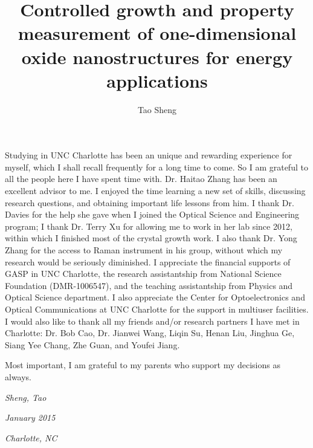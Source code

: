   \title{Controlled growth and property measurement of one-dimensional oxide nanostructures for energy applications}
  \author{Tao Sheng}
  \thesisyear{\the\year}



\maketitle



\begin{ackn}
Studying in UNC Charlotte has been an unique and rewarding experience for myself, which I shall recall frequently for a long time to come. So I am grateful to all the people here I have spent time with. Dr. Haitao Zhang has been an excellent advisor to me. I enjoyed the time learning a new set of skills, discussing research questions, and obtaining important life lessons from him. I thank Dr. Davies for the help she gave when I joined the Optical Science and Engineering program; I thank Dr. Terry Xu for allowing me to work in her lab since 2012, within which I finished most of the crystal growth work. I also thank Dr. Yong Zhang for the access to Raman instrument in his group, without which my research would be seriously diminished. I appreciate the financial supports of GASP in UNC Charlotte, the research assistantship from National Science Foundation (DMR-1006547), and the teaching assistantship from Physics and Optical Science department. I also appreciate the Center for Optoelectronics and Optical Communications at UNC Charlotte for the support in multiuser facilities. I would also like to thank all my friends and/or research partners I have met in Charlotte: Dr. Bob Cao, Dr. Jianwei Wang, Liqin Su, Henan Liu, Jinghua Ge, Siang Yee Chang, Zhe Guan, and Youfei Jiang. 

Most important, I am grateful to my parents who support my decisions as always. 


\begin{minipage}[b]{0.95\textwidth}

\begin{flushright}

\emph{Sheng, Tao}

\emph{January 2015}

\emph{Charlotte, NC}

\end{flushright}
\end{minipage}
\end{ackn}

